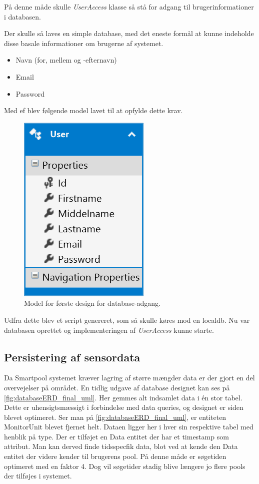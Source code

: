 På denne måde skulle \textit{UserAccess} klasse så stå for adgang til brugerinformationer i databasen. 

Der skulle så laves en simple database, med det eneste formål at kunne indeholde disse basale informationer om brugerne af systemet.

\begin{itemize}
	\item Navn (for, mellem og -efternavn)
	\item Email
	\item Password
\end{itemize}

Med \gls{ef} blev følgende model lavet til at opfylde dette krav.

\begin{figure}[h]
	\centering
	\includegraphics[width=0.25\linewidth]{figs/design/database_model_1}
	\caption{Model for første design for database-adgang.}
	\label{fig:database_model_1}
\end{figure}

Udfra dette blev et script genereret, som så skulle køres mod en localdb. Nu var databasen oprettet og implementeringen af \textit{UserAccess} kunne starte.

\subsection{Persistering af sensordata}
Da Smartpool systemet kræver lagring af større mængder data er der gjort en del overvejelser på området. En tidlig udgave af database designet kan ses på \ref{fig:databaseERD_final_uml}. Her gemmes alt indsamlet data i én stor tabel. Dette er uhensigtsmæssigt i forbindelse med data queries, og designet er siden blevet optimeret. Ser man på \ref{fig:databaseERD_final_uml}, er entiteten MonitorUnit blevet fjernet helt. Dataen ligger her i hver sin respektive tabel med henblik på type. Der er tilføjet en Data entitet der har et timestamp som attribut. Man kan derved finde tidsspecfik data, blot ved at kende den Data entitet der videre kender til brugerens pool. På denne måde er søgetiden optimeret med en faktor 4. Dog vil søgetider stadig blive længere jo flere pools der tilføjes i systemet.

